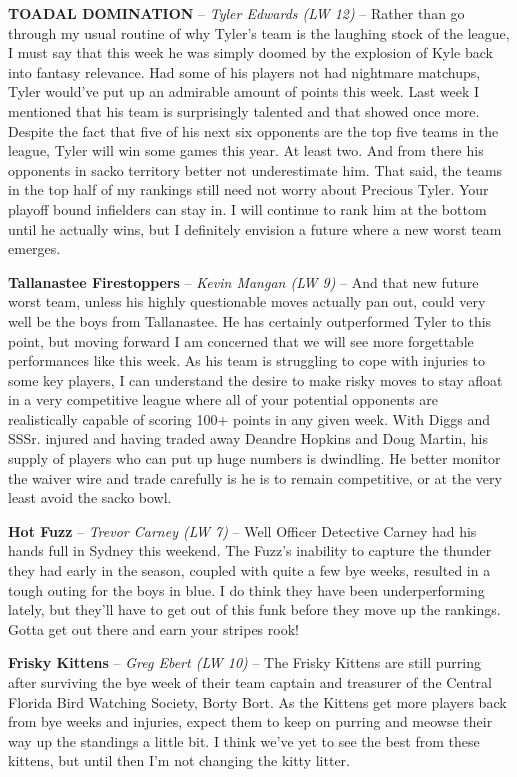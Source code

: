 \documentclass[11pt,letterpaper]{article}
\begin{document}
\newpage
{}
\begin{etaremune}
\item \textbf{TOADAL DOMINATION} -- \textit{Tyler Edwards (LW 12)} -- Rather than go through my usual routine of why Tyler's team is the laughing stock of the league, I must say that this week he was simply doomed by the explosion of Kyle back into fantasy relevance. Had some of his players not had nightmare matchups, Tyler would've put up an admirable amount of points this week. Last week I mentioned that his team is surprisingly talented and that showed once more. Despite the fact that five of his next six opponents are the top five teams in the league, Tyler will win some games this year. At least two. And from there his opponents in sacko territory better not underestimate him. That said, the teams in the top half of my rankings still need not worry about Precious Tyler. Your playoff bound infielders can stay in. I will continue to rank him at the bottom until he actually wins, but I definitely envision a future where a new worst team emerges. 
\item \textbf{Tallanastee Firestoppers} -- \textit{Kevin Mangan (LW 9)} -- And that new future worst team, unless his highly questionable moves actually pan out, could very well be the boys from Tallanastee. He has certainly outperformed Tyler to this point, but moving forward I am concerned that we will see more forgettable performances like this week. As his team is struggling to cope with injuries to some key players, I can understand the desire to make risky moves to stay afloat in a very competitive league where all of your potential opponents are realistically capable of scoring 100+ points in any given week. With Diggs and SSSr. injured and having traded away Deandre Hopkins and Doug Martin, his supply of players who can put up huge numbers is dwindling. He better monitor the waiver wire and trade carefully is he is to remain competitive, or at the very least avoid the sacko bowl. 
\item \textbf{Hot Fuzz} -- \textit{Trevor Carney (LW 7)} -- Well Officer Detective Carney had his hands full in Sydney this weekend. The Fuzz's inability to capture the thunder they had early in the season, coupled with quite a few bye weeks, resulted in a tough outing for the boys in blue. I do think they have been underperforming lately, but they'll have to get out of this funk before they move up the rankings. Gotta get out there and earn your stripes rook!
\item \textbf{Frisky Kittens} -- \textit{Greg Ebert (LW 10)} -- The Frisky Kittens are still purring after surviving the bye week of their team captain and treasurer of the Central Florida Bird Watching Society, Borty Bort. As the Kittens get more players back from bye weeks and injuries, expect them to keep on purring and meowse their way up the standings a little bit. I think we've yet to see the best from these kittens, but until then I'm not changing the kitty litter.

\end{etaremune}
\end{document}
